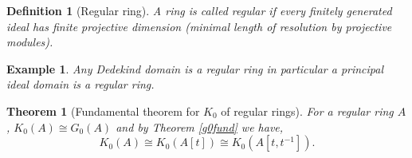 \documentclass[12pt]{report}
\numberwithin{equation}{section}
\newtheorem{theorem}[dummy]{Theorem}
\newtheorem{definition}[dummy]{Definition}
\newtheorem{example}[dummy]{Example}
\begin{document}
	
	\begin{definition}[Regular ring] A ring is called regular if every finitely generated ideal has finite projective dimension (minimal length of resolution by projective modules).
	\end{definition}
	\begin{example}
		Any Dedekind domain is a regular ring in particular a principal ideal domain is a regular ring.
	\end{example}

	\begin{theorem}[Fundamental theorem for $K_0$ of regular rings]\label{extensionk0iscong}
		For a regular ring $A$, $K_0(A)\cong G_0(A)$ and by Theorem \ref{g0fund} we have, \[ K_0(A) \cong K_0(A[t]) \cong K_0(A[t,t^{-1}]) .\]
	\end{theorem}

	
%		
	
\end{document}
